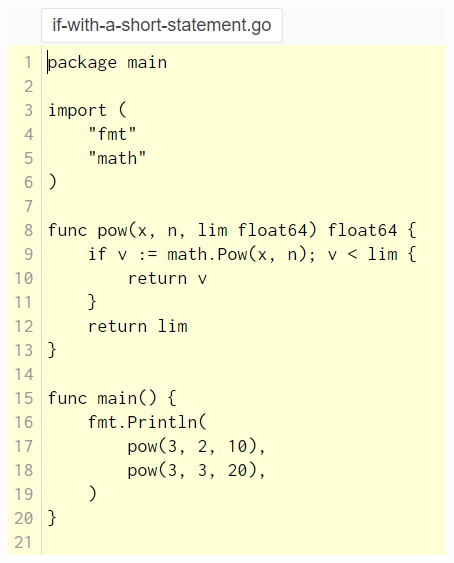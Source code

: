 \documentclass[14pt]{beamer}
\begin{document}
{\begin{frame}
\begin{columns}
\begin{column}{0.5\textwidth}
        \includegraphics[width=0.9\linewidth]{img/ifshort.PNG}
        \end{column}
    \end{columns}
\end{frame}
}
\end{document}
